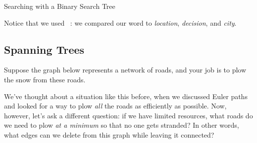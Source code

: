 \begin{example}{Searching with a Binary Search Tree}
\begin{center}
\end{center}

Notice that we used \ : we compared our word to \emph{location}, \emph{decision}, and \emph{city}.
\end{example}

\subsection{Spanning Trees}
Suppose the graph below represents a network of roads, and your job is to plow the snow from these roads.
\begin{center}
\end{center}

We've thought about a situation like this before, when we discussed Euler paths and looked for a way to plow \emph{all} the roads as efficiently as possible.  Now, however, let's ask a different question: if we have limited resources, what roads do we need to plow \emph{at a minimum} so that no one gets stranded?  In other words, what edges can we delete from this graph while leaving it connected?
\pagebreak

